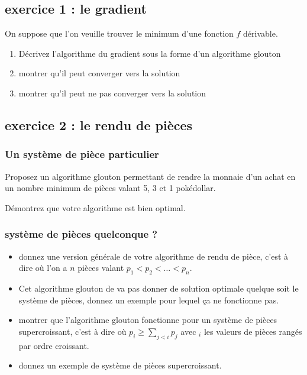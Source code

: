 \documentclass[
]{article}
\providecommand{\tightlist}{%
  \setlength{\itemsep}{0pt}\setlength{\parskip}{0pt}}
\begin{document}
\hypertarget{exercice-1-le-gradient}{%
\subsection{exercice 1 : le gradient}\label{exercice-1-le-gradient}}

On suppose que l'on veuille trouver le minimum d'une fonction $f$
dérivable.

\begin{enumerate}
\def\labelenumi{\arabic{enumi}.}
\tightlist
\item
  Décrivez l'algorithme du gradient sous la forme d'un algorithme
  glouton
\item
  montrer qu'il peut converger vers la solution
\item
  montrer qu'il peut ne pas converger vers la solution
\end{enumerate}

\hypertarget{exercice-2-le-rendu-de-piuxe8ces}{%
\subsection{exercice 2 : le rendu de
pièces}\label{exercice-2-le-rendu-de-piuxe8ces}}

\hypertarget{un-systuxe8me-de-piuxe8ce-particulier}{%
\subsubsection{Un système de pièce
particulier}\label{un-systuxe8me-de-piuxe8ce-particulier}}

Proposez un algorithme glouton permettant de rendre la monnaie d'un
achat en un nombre minimum de pièces valant 5, 3 et 1 pokédollar.

Démontrez que votre algorithme est bien optimal.

\hypertarget{systuxe8me-de-piuxe8ces-quelconque}{%
\subsubsection{système de pièces quelconque
?}\label{systuxe8me-de-piuxe8ces-quelconque}}

\begin{itemize}
\tightlist
\item
  donnez une version générale de votre algorithme de rendu de pièce,
  c'est à dire où l'on a $n$ pièces valant
  $p_1 < p_2 < \dots < p_n$.
\item
  Cet algorithme glouton de va pas donner de solution optimale quelque
  soit le système de pièces, donnez un exemple pour lequel ça ne
  fonctionne pas.
\item
  montrer que l'algorithme glouton fonctionne pour un système de pièces
  supercroissant, c'est à dire où $p_i \geq \sum_{j< i} p_j$ avec
  $_i$ les valeurs de pièces rangés par ordre croissant.
\item
  donnez un exemple de système de pièces supercroissant.
\end{itemize}
\end{document}
